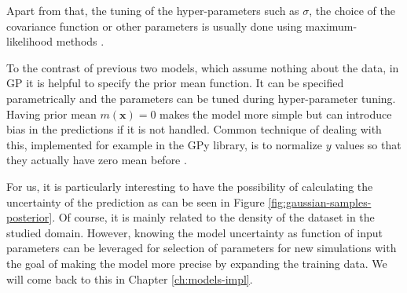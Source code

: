 Apart from that, the tuning of the hyper-parameters such as $\sigma$, the choice of the covariance function or other parameters is usually done using maximum-likelihood methods \cite{rasmussen2004}.

To the contrast of previous two models, which assume nothing about the data, in GP it is helpful to specify the prior mean function. It can be specified parametrically and the parameters can be tuned during hyper-parameter tuning. Having prior mean $m(\bm{x}) = 0$ makes the model more simple but can introduce bias in the predictions if it is not handled. Common technique of dealing with this, implemented for example in the GPy library, is to normalize $y$ values so that they actually have zero mean before \cite{gpy}. 

For us, it is particularly interesting to have the possibility of calculating the uncertainty of the prediction as can be seen in Figure \ref{fig:gaussian-samples-posterior}. Of course, it is mainly related to the density of the dataset in the studied domain. However, knowing the model uncertainty as function of input parameters can be leveraged for selection of parameters for new simulations with the goal of making the model more precise by expanding the training data. We will come back to this in Chapter \ref{ch:models-impl}.

